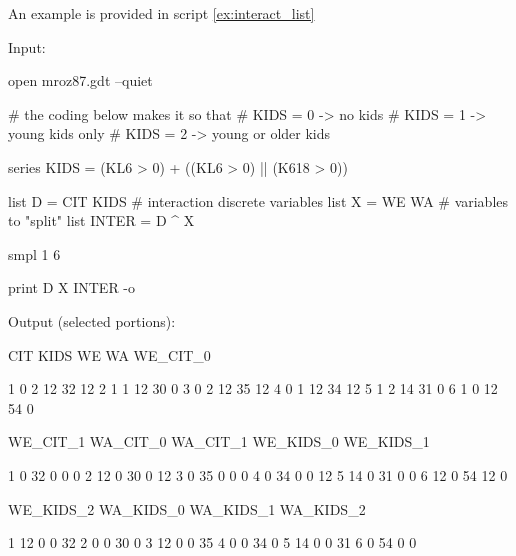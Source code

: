An example is provided in script \ref{ex:interact_list}

\begin{script}[ht]
  \label{ex:interact_list}
Input:
\begin{scodebit}
open mroz87.gdt --quiet

# the coding below makes it so that
# KIDS = 0 -> no kids
# KIDS = 1 -> young kids only
# KIDS = 2 -> young or older kids

series KIDS = (KL6 > 0) + ((KL6 > 0) || (K618 > 0))

list D = CIT KIDS # interaction discrete variables 
list X = WE WA    # variables to "split"
list INTER = D ^ X

smpl 1 6

print D X INTER -o
\end{scodebit}

Output (selected portions):
\begin{outbit}
           CIT         KIDS           WE           WA     WE_CIT_0

1            0            2           12           32           12
2            1            1           12           30            0
3            0            2           12           35           12
4            0            1           12           34           12
5            1            2           14           31            0
6            1            0           12           54            0

      WE_CIT_1     WA_CIT_0     WA_CIT_1    WE_KIDS_0    WE_KIDS_1

1            0           32            0            0            0
2           12            0           30            0           12
3            0           35            0            0            0
4            0           34            0            0           12
5           14            0           31            0            0
6           12            0           54           12            0

     WE_KIDS_2    WA_KIDS_0    WA_KIDS_1    WA_KIDS_2

1           12            0            0           32
2            0            0           30            0
3           12            0            0           35
4            0            0           34            0
5           14            0            0           31
6            0           54            0            0

\end{outbit}
\end{script}

